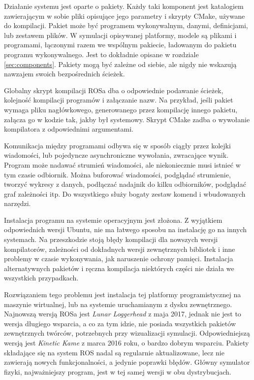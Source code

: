 	Działanie systemu jest oparte o pakiety.
	Każdy taki komponent jest katalogiem zawierającym w sobie pliki opisujące jego parametry i skrypty CMake, używane do kompilacji.
	Pakiet może być programem wykonywalnym, danymi, definicjami, lub zestawem plików.
	W symulacji opisywanej platformy, modele są plikami i programami, łączonymi razem we wspólnym pakiecie, ładowanym do pakietu programu wykonywalnego.
	Jest to dokładnie opisane w rozdziale \ref{sec:components}.
	Pakiety mogą być zależne od siebie, ale nigdy nie wskazują nawzajem swoich bezpośrednich ścieżek.

	Globalny skrypt kompilacji ROSa dba o odpowiednie podawanie ścieżek, kolejność kompilacji programów i załączanie nazw.
	Na przykład, jeśli pakiet wymaga pliku nagłówkowego, generowanego przez kompilację innego pakietu, załącza go w kodzie tak, jakby był systemowy.
	Skrypt CMake zadba o wywołanie kompilatora z odpowiednimi argumentami.

	Komunikacja między programami odbywa się w sposób ciągły przez kolejki wiadomości, lub pojedyncze asynchroniczne wywołania, zwracające wynik.
	Program może nadawać strumień wiadomości, ale niekoniecznie musi istnieć w tym czasie odbiornik.
	Można buforować wiadomości, podglądać strumienie, tworzyć wykresy z danych, podłączać nadajnik do kilku odbiorników, podglądać graf zależności itp.
	Do wszystkiego służy bogaty zestaw komend i wbudowanych narzędzi.

	Instalacja programu na systemie operacyjnym jest złożona.
	Z wyjątkiem odpowiednich wersji Ubuntu, nie ma łatwego sposobu na instalację go na innych systemach.
	Na przeszkodzie stoją błędy kompilacji dla nowszych wersji kompilatorów, zależności od dokładnych wersji zewnętrznych bibliotek i 
	inne problemy w czasie wykonywania, jak naruszenie ochrony pamięci. 
	Instalacja alternatywnych pakietów i ręczna kompilacja niektórych części nie działa we wszystkich przypadkach.

	Rozwiązaniem tego problemu jest instalacja tej platformy programistycznej na maszynie wirtualnej, lub na systemie uruchamianym z dysku zewnętrznego. 
	Najnowszą wersją ROSa jest \emph{Lunar Loggerhead} z maja 2017, jednak nie jest to wersja długiego wsparcia, a co za tym idzie, nie posiada wszystkich
	pakietów zewnętrznych twórców, potrzebnych przy wizualizacji symulacji.
	Odpowiedniejszą wersją jest \emph{Kinetic Kame} z marca 2016 roku, o bardzo dobrym wsparciu.
	Pakiety składające się na system ROS nadal są regularnie aktualizowane, lecz nie zawierają nowych funkcjonalności, a jedynie poprawki błędów.
	Główny symulator fizyki, najważniejszy program, jest w tej samej wersji w obu dystrybucjach.

